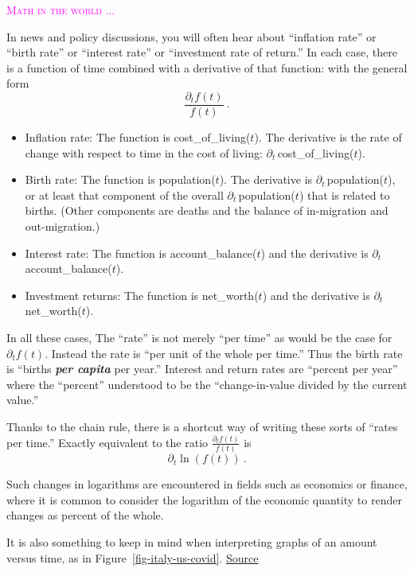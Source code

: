 \documentclass[
  letterpaper,
  DIV=11,
  numbers=noendperiod,
  oneside]{scrreprt}
\providecommand{\tightlist}{%
  \setlength{\itemsep}{0pt}\setlength{\parskip}{0pt}}
\newenvironment{intheworld}%
{%
\textcolor{magenta}{\hrulefill}%
  \par\vspace{.3\baselineskip}%
  \textcolor{magenta}{\scshape Math in the world ...}%
  \par\vspace{\baselineskip}%
}%
{\textcolor{magenta}{\hrulefill}}
\begin{document}
\begin{intheworld}
In news and policy discussions, you will often hear about ``inflation
rate'' or ``birth rate'' or ``interest rate'' or ``investment rate of
return.'' In each case, there is a function of time combined with a
derivative of that function: with the general form
\[\frac{\partial_t f(t)}{ f(t)}\ .\]

\begin{itemize}
\tightlist
\item
  Inflation rate: The function is cost\_of\_living(\(t\)). The
  derivative is the rate of change with respect to time in the cost of
  living: \(\partial_t\,\)cost\_of\_living(\(t\)).
\item
  Birth rate: The function is population(\(t\)). The derivative is
  \(\partial_t\,\)population(\(t\)), or at least that component of the
  overall \(\partial_t\,\)population(\(t\)) that is related to births.
  (Other components are deaths and the balance of in-migration and
  out-migration.)
\item
  Interest rate: The function is account\_balance(\(t\)) and the
  derivative is \(\partial_t\,\)account\_balance(\(t\)).
\item
  Investment returns: The function is net\_worth(\(t\)) and the
  derivative is \(\partial_t\,\)net\_worth(\(t\)).
\end{itemize}

In all these cases, The ``rate'' is not merely ``per time'' as would be
the case for \(\partial_t f(t)\). Instead the rate is ``per unit of the
whole per time.'' Thus the birth rate is ``births \textbf{\emph{per
capita}} per year.''
Interest and return rates are ``percent per year'' where the ``percent''
understood to be the ``change-in-value divided by the current value.''

Thanks to the chain rule, there is a shortcut way of writing these sorts
of ``rates per time.'' Exactly equivalent to the ratio
\(\frac{\partial_t f(t)}{ f(t)}\) is \[\partial_t \ln(f(t))\ .\]

Such changes in logarithms are encountered in fields such as economics
or finance, where it is common to consider the logarithm of the economic
quantity to render changes as percent of the whole.

It is also something to keep in mind when interpreting graphs of an
amount versus time, as in Figure~\ref{fig-italy-us-covid}.
\href{https://www.nytimes.com/2020/03/20/health/coronavirus-data-logarithm-chart.html}{Source}


\end{intheworld}
\end{document}

